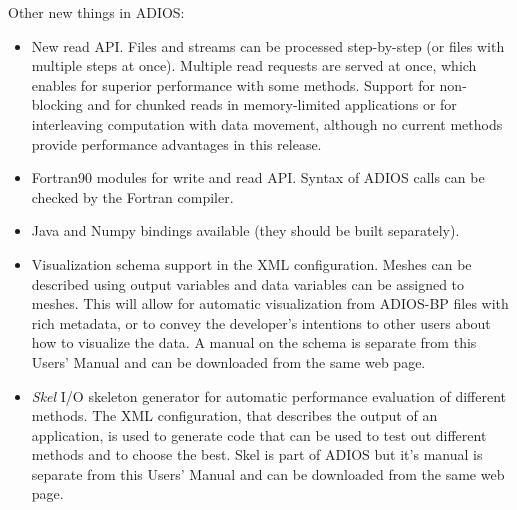 Other new things in ADIOS:
\begin{itemize}
\item New read API. Files and streams can be processed step-by-step (or files with multiple steps at once). Multiple read requests are served at once, which enables for superior performance with some methods. Support for non-blocking and for chunked reads in memory-limited applications or for interleaving computation with data movement, although no current methods provide performance advantages in this release.
\item Fortran90 modules for write and read API. Syntax of ADIOS calls can be checked by the Fortran compiler.
\item Java and Numpy bindings available (they should be built separately).
\item Visualization schema support in the XML configuration. Meshes can be described using output variables and data variables can be assigned to meshes. This will allow for automatic visualization from ADIOS-BP files with rich metadata, or to convey the developer's intentions to other users about how to visualize the data. A manual on the schema is separate from this Users' Manual and can be downloaded from the same web page.
\item \emph{Skel} I/O skeleton generator for automatic performance evaluation of different methods. The XML configuration, that describes the output of an application, is used to generate code that can be used to test out different methods and to choose the best. Skel is part of ADIOS but it's manual is separate from this Users' Manual and can be downloaded from the same web page.
\end{itemize}

